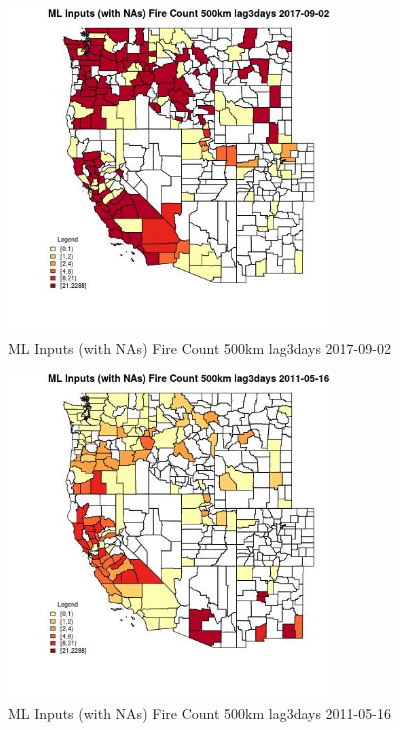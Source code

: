 \begin{figure} 
\centering  
\includegraphics[width=0.77\textwidth]{Code_Outputs/Report_ML_input_PM25_Step4_part_e_de_duplicated_aves_compiled_2019-05-21wNAs_CountyFire_Count_500km_lag3daysMean2017-09-02.jpg} 
\caption{\label{fig:Report_ML_input_PM25_Step4_part_e_de_duplicated_aves_compiled_2019-05-21wNAsCountyFire_Count_500km_lag3daysMean2017-09-02}ML Inputs (with NAs) Fire Count 500km lag3days 2017-09-02} 
\end{figure} 
 

\begin{figure} 
\centering  
\includegraphics[width=0.77\textwidth]{Code_Outputs/Report_ML_input_PM25_Step4_part_e_de_duplicated_aves_compiled_2019-05-21wNAs_CountyFire_Count_500km_lag3daysMean2011-05-16.jpg} 
\caption{\label{fig:Report_ML_input_PM25_Step4_part_e_de_duplicated_aves_compiled_2019-05-21wNAsCountyFire_Count_500km_lag3daysMean2011-05-16}ML Inputs (with NAs) Fire Count 500km lag3days 2011-05-16} 
\end{figure} 
 

